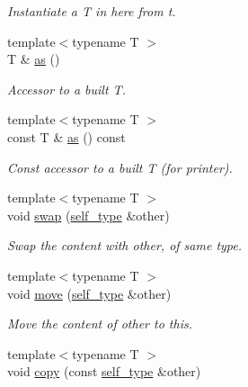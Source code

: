 \begin{DoxyCompactItemize}
\begin{DoxyCompactList}\small\item\em Instantiate a {\itshape T} in here from {\itshape t}. \end{DoxyCompactList}\item 
\hypertarget{structyy_1_1variant_a7fae4866c8d57a6f2ea30e9926e367cd}{}{\footnotesize template$<$typename T $>$ }\\T \& \hyperlink{structyy_1_1variant_a7fae4866c8d57a6f2ea30e9926e367cd}{as} ()\label{structyy_1_1variant_a7fae4866c8d57a6f2ea30e9926e367cd}

\begin{DoxyCompactList}\small\item\em Accessor to a built {\itshape T}. \end{DoxyCompactList}\item 
\hypertarget{structyy_1_1variant_a7930977f8a1b707c687daec8b0d76e70}{}{\footnotesize template$<$typename T $>$ }\\const T \& \hyperlink{structyy_1_1variant_a7930977f8a1b707c687daec8b0d76e70}{as} () const \label{structyy_1_1variant_a7930977f8a1b707c687daec8b0d76e70}

\begin{DoxyCompactList}\small\item\em Const accessor to a built {\itshape T} (for printer). \end{DoxyCompactList}\item 
{\footnotesize template$<$typename T $>$ }\\void \hyperlink{structyy_1_1variant_ac43b5ffdcedbda5462c53832027707ac}{swap} (\hyperlink{structyy_1_1variant_afbd75aee339bd9fa06e6fa8f320cecd3}{self\+\_\+type} \&other)
\begin{DoxyCompactList}\small\item\em Swap the content with {\itshape other}, of same type. \end{DoxyCompactList}\item 
{\footnotesize template$<$typename T $>$ }\\void \hyperlink{structyy_1_1variant_ae71b4ef21f1446b328b9d93dbc6806e1}{move} (\hyperlink{structyy_1_1variant_afbd75aee339bd9fa06e6fa8f320cecd3}{self\+\_\+type} \&other)
\begin{DoxyCompactList}\small\item\em Move the content of {\itshape other} to this. \end{DoxyCompactList}\item 
\hypertarget{structyy_1_1variant_a526d966e2923f6ae1d3fab2e1eac5311}{}{\footnotesize template$<$typename T $>$ }\\void \hyperlink{structyy_1_1variant_a526d966e2923f6ae1d3fab2e1eac5311}{copy} (const \hyperlink{structyy_1_1variant_afbd75aee339bd9fa06e6fa8f320cecd3}{self\+\_\+type} \&other)\label{structyy_1_1variant_a526d966e2923f6ae1d3fab2e1eac5311}


\end{DoxyCompactItemize}
